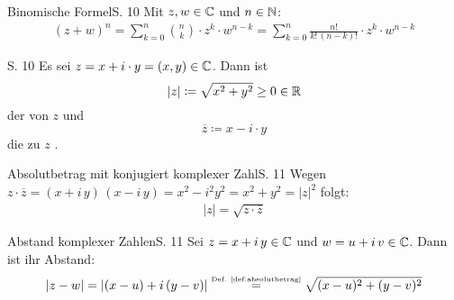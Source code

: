 \begin{bemerkung}{Binomische Formel}{S. 10}
  Mit $z, w \in \mathbb{C}$ und $n \in \mathbb{N}$:
  \begin{align}
    (z + w)^n
      = \sum_{k=0}^n \binom{n}{k} \cdot z^k \cdot w^{n-k}
      = \sum_{k=0}^n \frac{n!}{k! \, (n-k)!} \cdot z^k \cdot w^{n-k}
  \end{align}
\end{bemerkung}

\begin{definition}{S. 10}
  \label{def:absolutbetrag}
  Es sei $z = x + i \cdot y = (x, y) \in \mathbb{C}$.
  Dann ist
  \[ |z| \coloneqq \sqrt{x^2 + y^2} \geq 0 \in \mathbb{R} \]
  der  von $z$ und
  \[ \overline{z} \coloneqq x - i \cdot y \]
  die zu $z$ .
\end{definition}

\begin{bemerkung}{Absolutbetrag mit konjugiert komplexer Zahl}{S. 11}
  Wegen $z \cdot \overline{z} = (x + i \, y) \, (x - i \, y) = x^2 - i^2 y^2 = x^2 + y^2 = |z|^2$ folgt:
  \begin{align}
    |z| = \sqrt{z \cdot \overline{z}}
  \end{align}
\end{bemerkung}

\begin{bemerkung}{Abstand komplexer Zahlen}{S. 11}
  Sei $z = x + i \, y \in \mathbb{C}$ und $w = u + i \, v \in \mathbb{C}$.
  Dann ist ihr Abstand:
  \begin{align}
    | z - w |
      = | (x-u) + i \, (y-v) |
      \stackrel{\text{\tiny{Def. \ref{def:absolutbetrag}}}}{=} \sqrt{(x-u)^2 + (y-v)^2 }
  \end{align}
\end{bemerkung}

